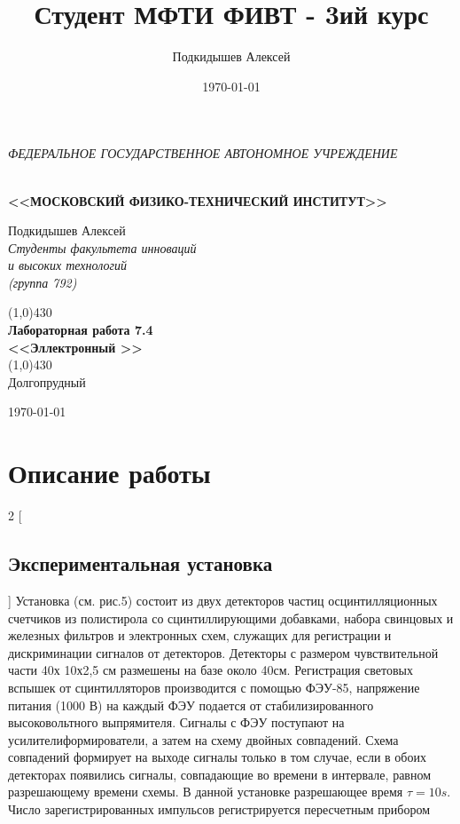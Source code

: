 \documentclass[a4paper,12pt]{article}
\author{Подкидышев Алексей}
\title{Студент МФТИ ФИВТ - 3ий курс}
\date{\today}
\theoremstyle{plain} %
\theoremstyle{definition} %
\theoremstyle{remark} %
\renewcommand{\headrulewidth}{0mm}  %
\begin{document}

\begin{center}
	\textit{\MakeTextUppercase{федеральное государственное автономное учреждение}}
		
	\vspace{0.5ex}
	
	\textbf{ \\ \MakeTextUppercase{<<Московский Физико-технический институт>>}}
\end{center}
\vspace{13ex}
\begin{flushright}
	\noindent
	{Подкидышев Алексей}
	\\
	\textit{Студенты факультета инноваций\\ и высоких технологий\\(группа 792)}
\end{flushright}
\begin{center}
	\vspace{23ex}
	\line(1,0){430}\\[4ex]
	{\LARGE\textbf{Лабораторная работа 7.4}}
	\vspace{2ex}\\
	\textbf{\large{<<Эллектронный >>}}\\[3ex]
	\line(1,0){430}\\[5ex]
	\vfill
	Долгопрудный 
	
	{\today}
\end{center}

\newpage
\newpage
\renewcommand{\headrulewidth}{1pt}

\section{Описание работы}


\begin{multicols}{2}
[
\subsection{Экспериментальная установка}
]
Установка (см. рис.5) состоит из двух детекторов частиц осцинтилляционных счетчиков из полистирола со сцинтиллирующими добавками, набора свинцовых и железных фильтров и
электронных схем, служащих для регистрации и дискриминации
сигналов от детекторов. Детекторы с размером чувствительной
части 40х 10х2,5 см размешены на базе около 40см. Регистрация световых вспышек от сцинтилляторов производится с помощью ФЭУ-85, напряжение питания (1000 В) на каждый ФЭУ
подается от стабилизированного высоковольтного выпрямителя.
Сигналы с ФЭУ поступают на усилителиформирователи, а затем
на схему двойных совпадений. Схема совпадений формирует на выходе сигналы
только в том случае, если в обоих детекторах
появились сигналы, совпадающие во времени в интервале, равном разрешающему времени схемы. В данной установке разрешающее время $\tau = 10 s$. Число зарегистрированных импульсов
регистрируется пересчетным прибором
\end{multicols}
\end{document}
